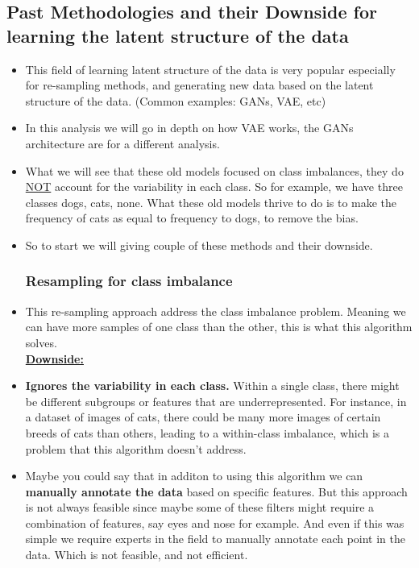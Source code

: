\documentclass{article}
\begin{document}
\subsection{Past Methodologies and their Downside for learning the latent structure of the data}
\begin{itemize}
\item This field of learning latent structure of the data is very popular especially for re-sampling methods, and generating new data based on the latent structure of the data. (Common examples: GANs, VAE, etc) 
\item In this analysis we will go in depth on how VAE works, the GANs architecture are for a different analysis. 
\item What we will see that these old models focused on class imbalances, they do \underline{NOT} account for the variability in each class. So for example, we have three classes dogs, cats, none. What these old models thrive to do is to make the frequency of cats as equal to frequency to dogs, to remove the bias.
\item So to start we will giving couple of these methods and their downside. 
\subsubsection{Resampling for class imbalance}
\item This re-sampling approach address the class imbalance problem. Meaning we can have more samples of one class than the other, this is what this algorithm solves. \\
\textbf{\underline{Downside:}} 
\item \textbf{Ignores the variability in each class.} Within a single class, there might be different subgroups or features that are underrepresented. For instance, in a dataset of images of cats, there could be many more images of certain breeds of cats than others, leading to a within-class imbalance, which is a problem that this algorithm doesn't address. 
\item Maybe you could say that in additon to using this algorithm we can \textbf{manually annotate the data} based on specific features. But this approach is not always feasible since maybe some of these filters might require a combination of features, say eyes and nose for example. And even if this was simple we require experts in the field to manually annotate each point in the data. Which is not feasible, and not efficient.

\end{itemize}
\end{document}
